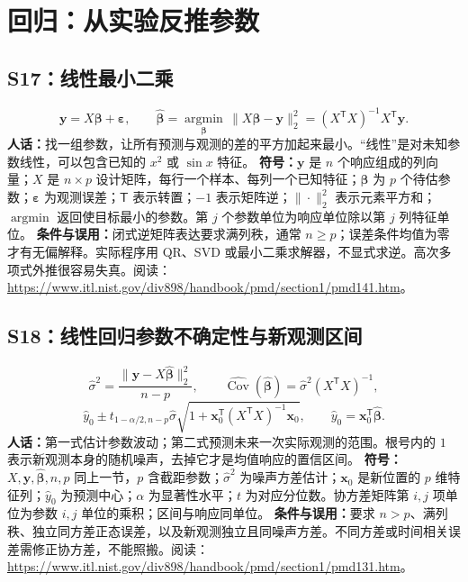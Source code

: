 \documentclass[UTF8,zihao=-4,openany,oneside,fontset=windows]{ctexbook}
\begin{document}
\section{回归：从实验反推参数}
\subsection{S17：线性最小二乘}
\begin{equation}
 \mathbf y=X\boldsymbol\beta+\boldsymbol\varepsilon,\qquad
 \hat{\boldsymbol\beta}=\underset{\boldsymbol\beta}{\operatorname{argmin}}\,
 \|X\boldsymbol\beta-\mathbf y\|_2^2
 =(X^{\mathsf T}X)^{-1}X^{\mathsf T}\mathbf y.
\end{equation}
\textbf{人话：}找一组参数，让所有预测与观测的差的平方加起来最小。“线性”是对未知参数线性，可以包含已知的 $x^2$ 或 $\sin x$ 特征。
\textbf{符号：}$\mathbf y$ 是 $n$ 个响应组成的列向量；$X$ 是 $n\times p$ 设计矩阵，每行一个样本、每列一个已知特征；$\boldsymbol\beta$ 为 $p$ 个待估参数；$\boldsymbol\varepsilon$ 为观测误差；$\mathsf T$ 表示转置；$-1$ 表示矩阵逆；$\|\cdot\|_2^2$ 表示元素平方和；$\operatorname{argmin}$ 返回使目标最小的参数。第 $j$ 个参数单位为响应单位除以第 $j$ 列特征单位。
\textbf{条件与误用：}闭式逆矩阵表达要求满列秩，通常 $n\ge p$；误差条件均值为零才有无偏解释。实际程序用 QR、SVD 或最小二乘求解器，不显式求逆。高次多项式外推很容易失真。阅读：\url{https://www.itl.nist.gov/div898/handbook/pmd/section1/pmd141.htm}。

\subsection{S18：线性回归参数不确定性与新观测区间}
\begin{equation}
 \hat\sigma^2=\frac{\|\mathbf y-X\hat{\boldsymbol\beta}\|_2^2}{n-p},\qquad
 \widehat{\operatorname{Cov}}(\hat{\boldsymbol\beta})=\hat\sigma^2(X^{\mathsf T}X)^{-1},
\end{equation}
\begin{equation}
 \hat y_0\pm t_{1-\alpha/2,n-p}\hat\sigma\sqrt{1+\mathbf x_0^{\mathsf T}(X^{\mathsf T}X)^{-1}\mathbf x_0},\qquad
 \hat y_0=\mathbf x_0^{\mathsf T}\hat{\boldsymbol\beta}.
\end{equation}
\textbf{人话：}第一式估计参数波动；第二式预测未来一次实际观测的范围。根号内的 $1$ 表示新观测本身的随机噪声，去掉它才是均值响应的置信区间。
\textbf{符号：}$X,\mathbf y,\hat{\boldsymbol\beta},n,p$ 同上一节，$p$ 含截距参数；$\hat\sigma^2$ 为噪声方差估计；$\mathbf x_0$ 是新位置的 $p$ 维特征列；$\hat y_0$ 为预测中心；$\alpha$ 为显著性水平；$t$ 为对应分位数。协方差矩阵第 $i,j$ 项单位为参数 $i,j$ 单位的乘积；区间与响应同单位。
\textbf{条件与误用：}要求 $n>p$、满列秩、独立同方差正态误差，以及新观测独立且同噪声方差。不同方差或时间相关误差需修正协方差，不能照搬。阅读：\url{https://www.itl.nist.gov/div898/handbook/pmd/section1/pmd131.htm}。
\end{document}
